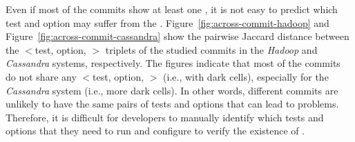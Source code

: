 Even if most of the commits show at least one \inconsistent, it is not easy to predict which test and option may suffer from the \inconsistent. 
Figure~\ref{fig:across-commit-hadoop} and Figure~\ref{fig:across-commit-cassandra} show the pairwise Jaccard distance between the $<$test, option, \inconsistent$>$ triplets of the studied commits in the \emph{Hadoop} and \emph{Cassandra} systems, respectively. 
The figures indicate that most of the commits do not share any $<$test, option, \inconsistent$>$ (i.e., with dark cells), especially for the \emph{Cassandra} system (i.e., more dark cells).
In other words, different commits are unlikely to have the same pairs of tests and options that can lead to \inconsistent problems. %
Therefore, it is difficult for developers to manually identify which tests and options that they need to run and configure to verify the existence of \inconsistent. 

